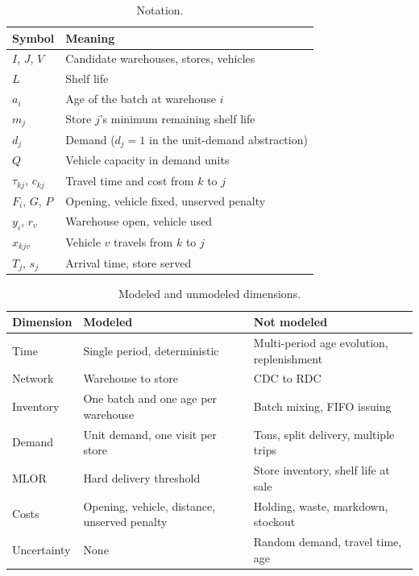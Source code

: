 \documentclass[preprint,12pt]{elsarticle}
\begin{document}
\begin{table}[t]
\centering
\caption{Notation.}
\label{tab:notation}
\begin{tabular}{ll}
\toprule
Symbol & Meaning \\
\midrule
$I$, $J$, $V$ & Candidate warehouses, stores, vehicles \\
$L$ & Shelf life \\
$a_i$ & Age of the batch at warehouse $i$ \\
$m_j$ & Store $j$'s minimum remaining shelf life \\
$d_j$ & Demand ($d_j=1$ in the unit-demand abstraction) \\
$Q$ & Vehicle capacity in demand units \\
$\tau_{kj}$, $c_{kj}$ & Travel time and cost from $k$ to $j$ \\
$F_i$, $G$, $P$ & Opening, vehicle fixed, unserved penalty \\
$y_i$, $r_v$ & Warehouse open, vehicle used \\
$x_{kjv}$ & Vehicle $v$ travels from $k$ to $j$ \\
$T_j$, $s_j$ & Arrival time, store served \\
\bottomrule
\end{tabular}
\end{table}

\begin{table}[t]
\centering
\caption{Modeled and unmodeled dimensions.}
\label{tab:scope}
\small
\begin{tabular}{p{2.0cm}p{4.6cm}p{5.6cm}}
\toprule
Dimension & Modeled & Not modeled \\
\midrule
Time & Single period, deterministic & Multi-period age evolution, replenishment \\
Network & Warehouse to store & CDC to RDC \\
Inventory & One batch and one age per warehouse & Batch mixing, FIFO issuing \\
Demand & Unit demand, one visit per store & Tons, split delivery, multiple trips \\
MLOR & Hard delivery threshold & Store inventory, shelf life at sale \\
Costs & Opening, vehicle, distance, unserved penalty & Holding, waste, markdown, stockout \\
Uncertainty & None & Random demand, travel time, age \\
\bottomrule
\end{tabular}
\end{table}
\end{document}
